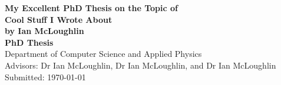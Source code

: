 
\newcommand{\thesistitle}{My Excellent PhD Thesis on the Topic of\\Cool Stuff I Wrote About}
\newcommand{\thesisauthor}{by Ian McLoughlin}
\newcommand{\thesisadvisor}{Advisors: Dr Ian McLoughlin, Dr Ian McLoughlin, and Dr Ian McLoughlin}
\newcommand{\thesistype}{PhD Thesis}
\newcommand{\thesisdate}{Submitted: \today}
\newcommand{\thesisdepartment}{Department of Computer Science and Applied Physics}

\begin{titlingpage}
  
  {\Huge\noindent\textbf{\thesistitle}}\\[12mm]
  {\LARGE\noindent\textbf{\thesisauthor}}\\[40mm]
  {\Large\noindent\textbf{\thesistype}}\\[4mm]
  {\Large\thesisdepartment}\\[4mm]
  {\Large\noindent\thesisadvisor}\\[4mm]
  {\Large\thesisdate}\\[4mm]

  
\end{titlingpage}